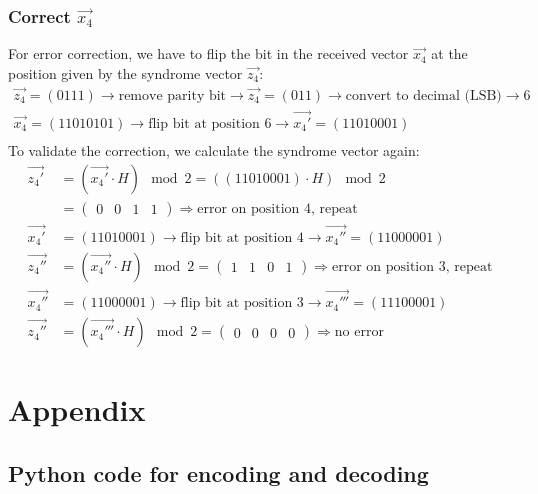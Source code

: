 \subsubsection*{Correct $\vec{x_4}$}
For error correction, we have to flip the bit in the received vector $\vec{x_4}$ at the position given by the syndrome vector $\vec{z_4}$:
\begin{align*}
  \vec{z_4} = (0111) \rightarrow \text{remove parity bit} \rightarrow \vec{z_4} = (011) \rightarrow \text{convert to decimal (LSB)} \rightarrow 6\\
  \vec{x_4} = (1 1 0 1 0 1 0 1) \rightarrow \text{flip bit at position 6} \rightarrow \vec{x_4'} = (1 1 0 1 0 0 0 1)\\
\end{align*}
To validate the correction, we calculate the syndrome vector again:
\begin{align*}
  \vec{z_4'} & = (\vec{x_4'} \cdot H) \mod 2 = ((11010001) \cdot H) \mod 2\\
   &= \begin{pmatrix}0 &0 &1 &1\end{pmatrix}
    \Rightarrow \text{error on position 4, repeat}\\
   \vec{x_4'} &= (11010001) \rightarrow \text{flip bit at position 4} \rightarrow \vec{x_4''} = (11000001)\\
   \vec{z_4''} & = (\vec{x_4''} \cdot H) \mod 2 = \begin{pmatrix}1 &1 &0 &1\end{pmatrix}
    \Rightarrow \text{error on position 3, repeat}\\
   \vec{x_4''} &= (11000001) \rightarrow \text{flip bit at position 3} \rightarrow \vec{x_4'''} = (11100001)\\
   \vec{z_4''} & = (\vec{x_4'''} \cdot H) \mod 2 = \begin{pmatrix}0 &0 &0 &0\end{pmatrix} \Rightarrow \text{no error}
\end{align*}


\section*{Appendix}
\subsection*{Python code for encoding and decoding}


